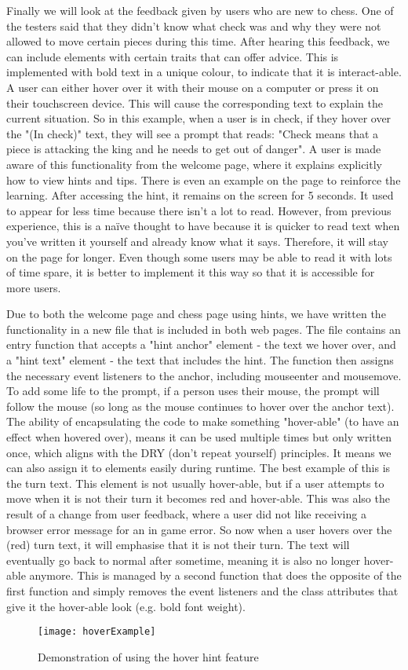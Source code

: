 Finally we will look at the feedback given by users who are new to chess. One of the testers said that they didn't know what check was and why they were not allowed to move certain pieces during this time. After hearing this feedback, we can include elements with certain traits that can offer advice. This is implemented with bold text in a unique colour, to indicate that it is interact-able. A user can either hover over it with their mouse on a computer or press it on their touchscreen device. This will cause the corresponding text to explain the current situation. So in this example, when a user is in check, if they hover over the "(In check)" text, they will see a prompt that reads: "Check means that a piece is attacking the king and he needs to get out of danger". A user is made aware of this functionality from the welcome page, where it explains explicitly how to view hints and tips. There is even an example on the page to reinforce the learning. After accessing the hint, it remains on the screen for 5 seconds. It used to appear for less time because there isn't a lot to read. However, from previous experience, this is a naïve thought to have because it is quicker to read text when you've written it yourself and already know what it says. Therefore, it will stay on the page for longer. Even though some users may be able to read it with lots of time spare, it is better to implement it this way so that it is accessible for more users.

Due to both the welcome page and chess page using hints, we have written the functionality in a new file that is included in both web pages. The file contains an entry function that accepts a "hint anchor" element - the text we hover over, and a "hint text" element - the text that includes the hint. The function then assigns the necessary event listeners to the anchor, including mouseenter and mousemove. To add some life to the prompt, if a person uses their mouse, the prompt will follow the mouse (so long as the mouse continues to hover over the anchor text). The ability of encapsulating the code to make something "hover-able" (to have an effect when hovered over), means it can be used multiple times but only written once, which aligns with the DRY (don't repeat yourself) principles. It means we can also assign it to elements easily during runtime. The best example of this is the turn text. This element is not usually hover-able, but if a user attempts to move when it is not their turn it becomes red and hover-able. This was also the result of a change from user feedback, where a user did not like receiving a browser error message for an in game error. So now when a user hovers over the (red) turn text, it will emphasise that it is not their turn. The text will eventually go back to normal after sometime, meaning it is also no longer hover-able anymore. This is managed by a second function that does the opposite of the first function and simply removes the event listeners and the class attributes that give it the hover-able look (e.g. bold font weight).

\begin{figure}
    \begin{center}
        \texttt{[image: hoverExample]}
        \caption{Demonstration of using the hover hint feature}
        \label{hoverExample}
    \end{center}
\end{figure}
